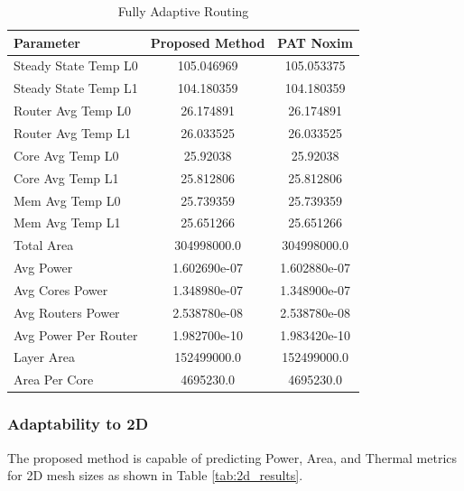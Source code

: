 \documentclass[conference]{IEEEtran}
\begin{document}
	\begin{table}[h!]
		\centering
		\begin{tabular}{|l|c|c|}
			\hline
			\textbf{Parameter} & \textbf{Proposed Method} & \textbf{PAT Noxim} \\ \hline
			Steady State Temp L0 & 105.046969 & 105.053375 \\ \hline
			Steady State Temp L1 & 104.180359 & 104.180359 \\ \hline
			Router Avg Temp L0 & 26.174891 & 26.174891 \\ \hline
			Router Avg Temp L1 & 26.033525 & 26.033525 \\ \hline
			Core Avg Temp L0 & 25.92038 & 25.92038 \\ \hline
			Core Avg Temp L1 & 25.812806 & 25.812806 \\ \hline
			Mem Avg Temp L0 & 25.739359 & 25.739359 \\ \hline
			Mem Avg Temp L1 & 25.651266 & 25.651266 \\ \hline
			Total Area & 304998000.0 & 304998000.0 \\ \hline
			Avg Power & 1.602690e-07 & 1.602880e-07 \\ \hline
			Avg Cores Power & 1.348980e-07 & 1.348900e-07 \\ \hline
			Avg Routers Power & 2.538780e-08 & 2.538780e-08 \\ \hline
			Avg Power Per Router & 1.982700e-10 & 1.983420e-10 \\ \hline
			Layer Area & 152499000.0 & 152499000.0 \\ \hline
			Area Per Core & 4695230.0 & 4695230.0 \\ \hline
		\end{tabular}
		\caption{Fully Adaptive Routing}
		\label{table:fully_adaptive_routing}
	\end{table}
	
	\subsubsection{Adaptability to 2D}
	The proposed method is capable of predicting Power, Area, and Thermal metrics for 2D mesh sizes as shown in Table \ref{tab:2d_results}.
	
\end{document}
